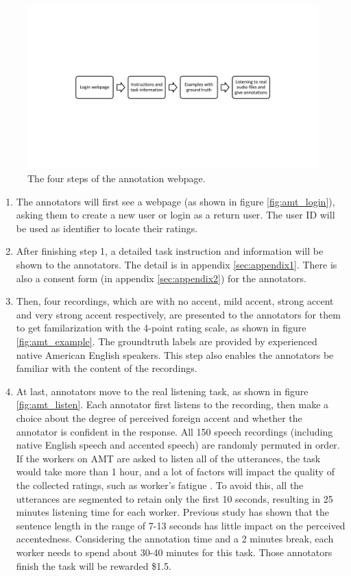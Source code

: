 \begin{figure}[t]
\centering
\captionsetup{justification=centering}
\includegraphics[width = 1.0\linewidth]{figures/amt_procedure.pdf}
\caption{The four steps of the annotation webpage.}
\label{fig:amt_procedure}
\end{figure}

\begin{enumerate}
\item The annotators will first see a webpage (as shown in figure \ref{fig:amt_login}), asking them to create a new user or login as a return user. The user ID will be used as identifier to locate their ratings.
\item After finishing step 1, a detailed task instruction and information will be shown to the annotators. The detail is in appendix \ref{sec:appendix1}. There is also a consent form (in appendix \ref{sec:appendix2}) for the annotators.
\item Then, four recordings, which are with no accent, mild accent, strong accent and very strong accent respectively, are presented to the annotators for them to get familarization with the 4-point rating scale, as shown in figure \ref{fig:amt_example}. The groundtruth labels are provided by experienced native American English speakers. This step also enables the annotators be familiar with the content of the recordings.
\item At last, annotators move to the real listening task, as shown in figure \ref{fig:amt_listen}. Each annotator first listens to the recording, then make a choice about the degree of perceived foreign accent and whether the annotator is confident in the response. All 150 speech recordings (including native English speech and accented speech) are randomly permuted in order. If the workers on AMT are asked to listen all of the utterances, the task would take more than 1 hour, and a lot of factors will impact the quality of the collected ratings, such as worker's fatigue \citep{rzeszotarski2013inserting}. To avoid this, all the utterances are segmented to retain only the first 10 seconds, resulting in 25 minutes listening time for each worker. Previous study \citep{munro1995foreign} has shown that the sentence length in the range of 7-13 seconds has little impact on the perceived accentedness. Considering the annotation time and a 2 minutes break, each worker needs to spend about 30-40 minutes for this task. Those annotators finish the task will be rewarded \$1.5.
\end{enumerate}


